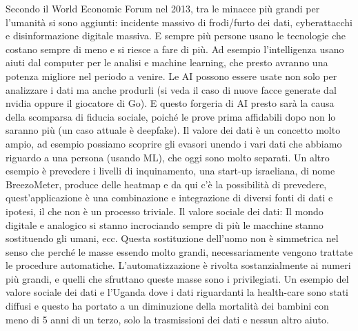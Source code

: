 \documentclass[11pt, a4page, twocolumn]{article}
\begin{document}
Secondo il World Economic Forum nel 2013, tra le minacce più grandi per l’umanità si sono aggiunti: incidente massivo di frodi/furto dei dati, cyberattacchi e disinformazione digitale massiva. E sempre più persone usano le tecnologie che costano sempre di meno e si riesce a fare di più. Ad esempio l’intelligenza usano aiuti dal computer per le analisi e machine learning, che presto avranno una potenza migliore nel periodo a venire. Le AI possono essere usate non solo per analizzare i dati ma anche produrli (si veda il caso di nuove facce generate dal nvidia oppure il giocatore di Go). E questo forgeria di AI presto sarà la causa della scomparsa di fiducia sociale, poiché le prove prima affidabili dopo non lo saranno più (un caso attuale è deepfake).
Il valore dei dati è un concetto molto ampio, ad esempio possiamo scoprire gli evasori unendo i vari dati che abbiamo riguardo a una persona (usando ML), che oggi sono molto separati. Un altro esempio è prevedere i livelli di inquinamento, una start-up israeliana, di nome BreezoMeter, produce delle heatmap e da qui c’è la possibilità di prevedere, quest’applicazione è una combinazione e integrazione di diversi fonti di dati e ipotesi, il che non è un processo triviale. 
Il valore sociale dei dati: Il mondo digitale e analogico si stanno incrociando sempre di più le macchine stanno sostituendo gli umani, ecc. Questa sostituzione dell’uomo non è simmetrica nel senso che perché le masse essendo molto grandi, necessariamente vengono trattate le procedure automatiche. L’automatizzazione è rivolta sostanzialmente ai numeri più grandi, e quelli che sfruttano queste masse sono i privilegiati. Un esempio del valore sociale dei dati e l’Uganda dove i dati riguardanti la health-care sono stati diffusi e questo ha portato a un diminuzione della mortalità dei bambini con meno di 5 anni di un terzo, solo la trasmissioni dei dati e nessun altro aiuto. 
\end{document}

